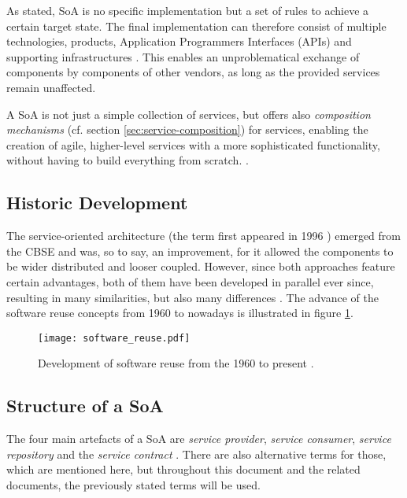 As stated, SoA is no specific implementation but a set of rules to achieve a certain target state. The final implementation can therefore consist of multiple technologies, products, Application Programmers Interfaces (APIs) and supporting infrastructures \cite[p.29]{erl2011}. This enables an unproblematical exchange of components by components of other vendors, as long as the provided services remain unaffected.

A SoA is not just a simple collection of services, but offers also \emph{composition mechanisms} (cf. section \ref{sec:service-composition}) for services, enabling the creation of agile, higher-level services with a more sophisticated functionality, without having to build everything from scratch. \cite[p.12]{josuttis}.



\subsection{Historic Development}
The service-oriented architecture (the term first appeared in 1996 \cite[p.7]{rosen}) emerged from the CBSE and was, so to say, an improvement, for it allowed the components to be wider distributed and looser coupled. However, since both approaches feature certain advantages, both of them have been developed in parallel ever since, resulting in many similarities, but also many differences \cite{breivold}. The advance of the software reuse concepts from 1960 to nowadays is illustrated in figure \ref{fig:software_reuse}.



\begin{figure}[!htbp]
\centering
\texttt{[image: software\_reuse.pdf]}
\caption{Development of software reuse from the 1960 to present \cite{clements}.}
\label{fig:software_reuse}
\end{figure}


\subsection{Structure of a SoA}
\label{sec:structure_of_soa}
The four main artefacts of a SoA are \emph{service provider}, \emph{service consumer}, \emph{service repository} and the \emph{service contract} \cite{arrowhead} \cite{breivold} \cite{rodrigues2011}. There are also alternative terms for those, which are mentioned here, but throughout this document and the related documents, the previously stated terms will be used.

